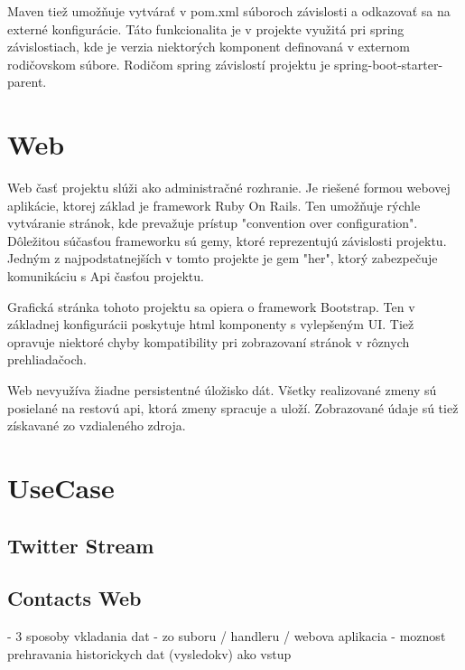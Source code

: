 		Maven tiež umožňuje vytvárať v pom.xml súboroch závislosti a odkazovať sa na externé konfigurácie. Táto funkcionalita je v projekte využitá pri spring závislostiach, kde je verzia niektorých komponent definovaná v externom rodičovskom súbore. Rodičom spring závislostí projektu je spring-boot-starter-parent.
		

\section{Web}
	Web časť projektu slúži ako administračné rozhranie. Je riešené formou webovej aplikácie, ktorej základ je framework Ruby On Rails. Ten umožňuje rýchle vytváranie stránok, kde prevažuje prístup "convention over configuration". Dôležitou súčasťou frameworku sú gemy, ktoré reprezentujú závislosti projektu. Jedným z najpodstatnejších v tomto projekte je gem "her", ktorý zabezpečuje komunikáciu s Api časťou projektu.
	
	Grafická stránka tohoto projektu sa opiera o framework Bootstrap. Ten v základnej konfigurácii poskytuje html komponenty s vylepšeným UI. Tiež opravuje niektoré chyby kompatibility pri zobrazovaní stránok v rôznych prehliadačoch.
	
	Web nevyužíva žiadne persistentné úložisko dát. Všetky realizované zmeny sú posielané na restovú api, ktorá zmeny spracuje a uloží. Zobrazované údaje sú tiež získavané zo vzdialeného zdroja.
		
\section{UseCase}
	
	\subsection{Twitter Stream}
	\subsection{Contacts Web}
		
- 3 sposoby vkladania dat - zo suboru / handleru / webova aplikacia
- moznost prehravania historickych dat (vysledokv) ako vstup